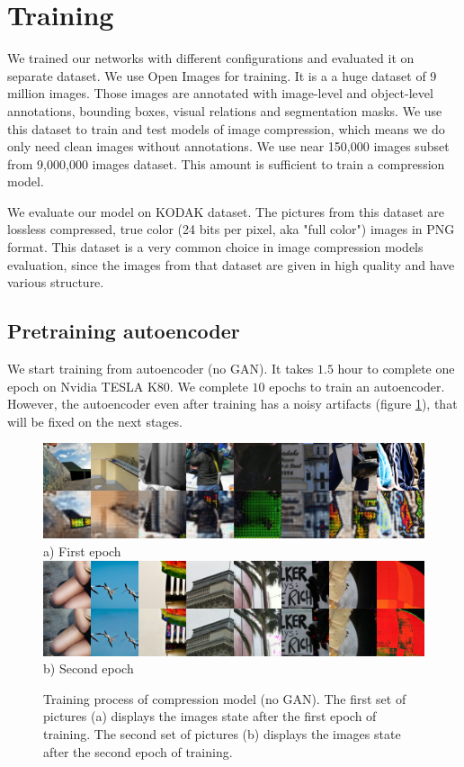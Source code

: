 \section{Training}

We trained our networks with different configurations and evaluated it on separate dataset. We use Open Images \cite{OpenImages2} for training. It is a a huge dataset of 9 million images. Those images are annotated with image-level and object-level annotations, bounding boxes, visual relations and segmentation masks. We use this dataset to train and test models of image compression, which means we do only need clean images without annotations. We use near 150,000 images subset from 9,000,000 images dataset. This amount is sufficient to train a compression model.

We evaluate our model on KODAK \cite{kodak} dataset. The pictures from this dataset are lossless compressed, true color (24 bits per pixel, aka "full color") images in PNG format. This dataset is a very common choice in image compression models evaluation, since the images from that dataset are given in high quality and have various structure.

\subsection{Pretraining autoencoder}

We start training from autoencoder (no GAN). It takes $1.5$ hour to complete one epoch on Nvidia TESLA K80. We complete $10$ epochs to train an autoencoder. However, the autoencoder even after training has a noisy artifacts (figure \ref{training-compression-examples}), that will be fixed on the next stages.

\begin{figure}[!ht]
    \centering
    \includegraphics[width=\textwidth]{figure/step_1000.png}
    a) First epoch
    \includegraphics[width=\textwidth]{figure/step_15000.png}
    b) Second epoch
    \caption{Training process of compression model (no GAN). The first set of pictures (a) displays the images state after the first epoch of training. The second set of pictures (b) displays the images state after the second epoch of training.}
    \label{training-compression-examples}
\end{figure}

